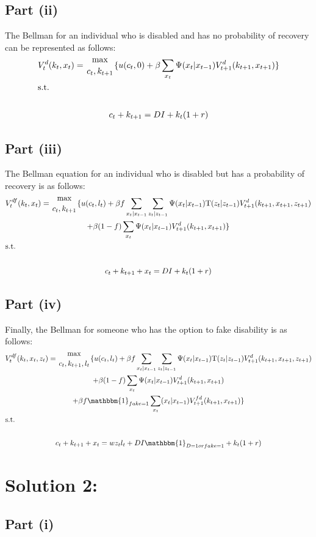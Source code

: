 \documentclass[10pt,a4paper]{article}
\begin{document}
  \subsection*{Part (ii)}
    The Bellman for an individual who is disabled and has no probability of recovery can be represented as follows:
    \begin{gather*}
      V_t^d(k_t,x_t) = {\max\atop{c_t,k_{t+1}}}\{u(c_t,0) + \beta\sum
      \limits_{x_t}\Psi(x_t|x_{t-1})V^d_{t+1}(k_{t+1},x_{t+1})\} \\
      \shortintertext{s.t.} \\
      c_t + k_{t+1} = DI + k_t(1+r)
    \end{gather*}
  \subsection*{Part (iii)}
    The Bellman equation for an individual who is disabled but has a probability of recovery is as follows:
    \begin{gather*}
      V_t^{df}(k_t,x_t) = {\max\atop{c_t,k_{t+1}}}\{u(c_t,l_t) +\beta 
      f\sum\limits_{x_t|x_{t-1}}\sum\limits_{z_t|z_{t-1}}\Psi(x_t|x_
      {t-1})\text{T}(z_t|z_{t-1})V^{d}_{t+1}(k_{t+1}, x_{t+1}, z_{t+1}) \\
      + \beta(1-f)\sum\limits_{x_t}\Psi(x_t|x_{t-1})V^d_{t+1}(k_{t+1},x_{t+1})\} \\
      \shortintertext{s.t.} \\
      c_t + k_{t+1} + x_t = DI + k_t(1+r) \\
    \end{gather*}
  \subsection*{Part (iv)}
    Finally, the Bellman for someone who has the option to fake disability is as follows:
    \begin{gather*}
      V_t^{df}(k_t,x_t,z_t) = {\max\atop{c_t,k_{t+1},l_t}}\{u(c_t,l_t) +\beta 
      f\sum\limits_{x_t|x_{t-1}}\sum\limits_{z_t|z_{t-1}}\Psi(x_t|x_
      {t-1})\text{T}(z_t|z_{t-1})V^{d}_{t+1}(k_{t+1}, x_{t+1}, z_{t+1}) \\
      + \beta(1-f)\sum\limits_{x_t}\Psi(x_t|x_{t-1})V^d_{t+1}(k_{t+1},x_{t+1}) \\
      + \beta f \mathbbm{1}_{fake = 1} \sum_{x_t}(x_t|x_{t-1})V_{t+1}^{fd}(k_{t+1},x_{t+1})\} \\
      \shortintertext{s.t.} \\
      c_t + k_{t+1} + x_t = wz_tl_t + DI\mathbbm{1}_{D = 1 or fake = 1} + k_t(1+r)
    \end{gather*}
\section*{Solution 2:} 
  \subsection{Part (i)}
    
\end{document}
